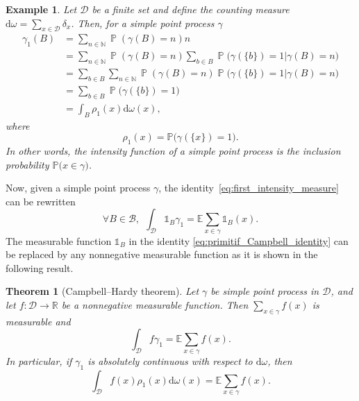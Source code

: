 \documentclass[twoside,11pt]{book}
\newtheorem{theorem}{Theorem}
\newtheorem{example}{Example}
\numberwithin{theorem}{chapter}
\numberwithin{definition}{chapter}
\numberwithin{proposition}{chapter}
\numberwithin{corollary}{chapter}
\numberwithin{example}{chapter}
\numberwithin{lemma}{chapter}
\numberwithin{assumption}{chapter}
\DeclareMathOperator{\Prb}{\mathbb{P}}
\begin{document}
\begin{example}\label{ex:rho_1_inclustion_probability_discret_set}
Let $\mathcal{D}$ be a finite set and define the counting measure $\mathrm{d}\omega = \sum\limits_{x \in \mathcal{D}} \delta_x$. Then, for a simple point process $\gamma$
\begin{align}
\gamma_1(B) & = \sum\limits_{n \in \mathbb{N}} \Prb(\gamma(B) = n) n\\
& = \sum\limits_{n \in \mathbb{N}} \Prb(\gamma(B) = n) \sum\limits_{b \in B} \Prb \big( \gamma(\{b\}) = 1| \gamma(B) = n \big) \nonumber\\
& = \sum\limits_{b \in B} \sum\limits_{n \in \mathbb{N}} \Prb(\gamma(B) = n)  \Prb \big( \gamma(\{b\}) = 1| \gamma(B) = n \big) \nonumber\\
& = \sum\limits_{b \in B}  \Prb \big( \gamma(\{b\}) = 1\big) \nonumber\\
& = \int_{B} \rho_{1}(x) \mathrm{d}\omega(x), \nonumber
\end{align}
where 
\begin{equation}
\rho_{1}(x) = \mathbb{P} \big(\gamma(\{x\}) = 1 \big).
\end{equation}
In other words, the intensity function of a simple point process is the inclusion probability $\mathbb{P} \big(x \in \gamma \big)$.

\end{example}


Now, given a simple point process $\gamma$, the identity~\eqref{eq:first_intensity_measure} can be rewritten 
\begin{equation}\label{eq:primitif_Campbell_identity}
\forall B \in \mathcal{B}, \:\:\int_{\mathcal{D}} \mathbb{1}_{B} \gamma_1 = \mathbb{E}\sum\limits_{x \in \gamma} \mathbb{1}_{B}(x).
\end{equation}
The measurable function $\mathbb{1}_{B}$ in the identity \eqref{eq:primitif_Campbell_identity} can be replaced by any nonnegative measurable function as it is shown in the following result.


\begin{theorem}[Campbell–Hardy theorem]
Let $\gamma$ be simple point process in $\mathcal{D}$, and let $f: \mathcal{D} \rightarrow \mathbb{R}$ be a nonnegative measurable function. Then  $\sum\limits_{x \in \gamma} f(x)$ is measurable and 
\begin{equation}
\int_{\mathcal{D}} f \gamma_1 = \mathbb{E}\sum\limits_{x \in \gamma} f(x).
\end{equation}
In particular, if $\gamma_1$ is absolutely continuous with respect to $\mathrm{d}\omega$, then
\begin{equation}
\int_{\mathcal{D}} f(x) \rho_1(x) \mathrm{d}\omega(x) = \mathbb{E}\sum\limits_{x \in \gamma} f(x).
\end{equation}


\end{theorem}
\end{document}
